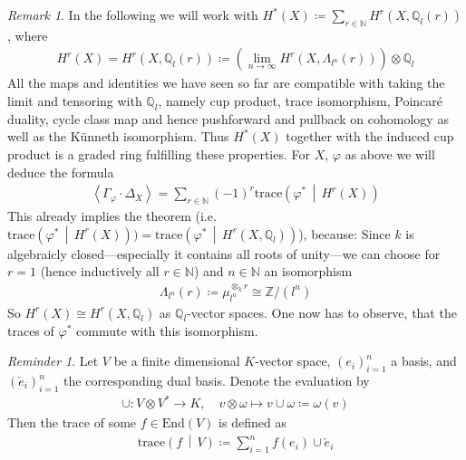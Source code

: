 \documentclass[english]{scrartcl}
\theoremstyle{definition}
\theoremstyle{remark}
\newtheorem{Rem}[Def]{Remark}
\newtheorem{Rev}[Def]{Reminder}
\newcommand*{\N}{\mathds{N}}
\newcommand*{\Z}{\mathds{Z}}
\newcommand*{\Q}{\mathds{Q}}
\newcommand*{\Zmod}[1]{\Z/#1} %
\newcommand*{\Zl}{\Z_l} %
\newcommand*{\Ql}{\Q_l} %
\newcommand*{\End}[1]{\text{End}(#1)} %
\newcommand*{\idest}{i.e.\ }
\newcommand*{\M}{\Lambda}
\newcommand*{\intProd}[2]{{#1\cdot#2}} %
\newcommand*{\intNum}[1]{{\left\langle{#1}\right\rangle}} %
\newcommand*{\Graph}[1]{{\Gamma_{#1}}} %
\newcommand*{\Diag}[1]{{\Delta_{#1}}} %
\newcommand*{\trace}[2]{{\text{trace}\left(#1 \,\middle|\, #2 \right)}} %
\renewcommand*{\phi}{\varphi}
\begin{document}
\begin{Rem}
  In the following we will work with
  $H^*(X)\coloneqq\sum_{r\in\N} H^r(X, \Ql(r))$, where
  \begin{gather*}
    H^r(X) = H^r(X,\Ql(r)) \coloneqq
    \left(\lim_{n\to\infty} H^r(X,\M_{l^n}(r))\right) \otimes \Ql
  \end{gather*}
  All the maps and identities we have seen so far are compatible with
  taking the limit and tensoring with $\Ql$, namely
  cup product,
  trace isomorphism,
  Poincaré duality,
  cycle class map and hence
  pushforward and pullback on cohomology as well as
  the Künneth isomorphism.
  Thus $H^*(X)$ together with the induced cup product is a graded ring
  fulfilling these properties.
  For $X$, $\phi$ as above we will deduce the formula
  \begin{gather*}
    \intNum{\intProd{\Graph{\phi}}{\Diag{X}}}
    = \sum_{r\in\N} (-1)^r \trace{\phi^*}{H^r(X)}
  \end{gather*}
  This already implies the theorem
  (\idest $\trace{\phi^*}{H^r(X)})=\trace{\phi^*}{H^r(X,\Ql)}$),
  because:
  Since $k$ is algebraicly closed---especially it contains all
  roots of unity---we can choose for $r=1$ (hence inductively all
  $r\in\N$) and $n\in\N$ an isomorphism
  \begin{gather*}
    \M_{l^n}(r)\coloneqq\mu_{l^n}^{\otimes_k r} \cong \Zmod{(l^n)}
  \end{gather*}
  So $H^r(X)\cong H^r(X,\Ql)$ as $\Ql$-vector spaces.
  One now has to observe, that the traces of $\phi^*$ commute with
  this isomorphism.
\end{Rem} 

\begin{Rev}
  Let $V$ be a finite dimensional $K$-vector space, $(e_i)_{i=1}^n$ a basis,
  and $(\check e_i)_{i=1}^n$ the corresponding dual basis.
  Denote the evaluation by
  \begin{align*}
    \cup\colon V\otimes V^* \to K,\quad
    v\otimes \omega \mapsto v\cup\omega\coloneqq \omega(v)
  \end{align*}
  Then the trace of some $f\in\End{V}$ is defined as
  \begin{gather*}
    \trace{f}{V} \coloneqq \sum_{i=1}^n f(e_i)\cup \check e_i
  \end{gather*}
\end{Rev}
\end{document}
